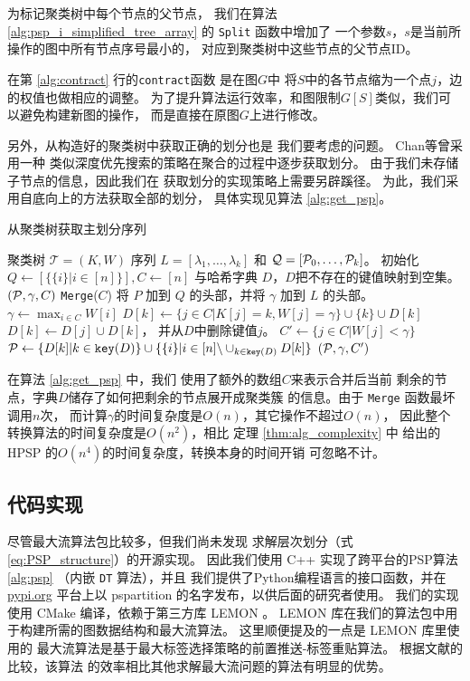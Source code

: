 为标记聚类树中每个节点的父节点，
我们在算法 \ref{alg:psp_i_simplified_tree_array} 的 \texttt{Split} 函数中增加了
一个参数$s$，$s$是当前所操作的图中所有节点序号最小的，
对应到聚类树中这些节点的父节点ID。

在第 \ref{alg:contract} 行的\texttt{contract}函数 是在图$G$中
将$S$中的各节点缩为一个点$j$，边的权值也做相应的调整。
为了提升算法运行效率，和图限制$G[S]$类似，我们可以避免构建新图的操作，
而是直接在原图$G$上进行修改。

另外，从构造好的聚类树中获取正确的划分也是
我们要考虑的问题。
Chan等\cite{chan2020agglomerative}曾采用一种
类似深度优先搜索的策略在聚合的过程中逐步获取划分。
由于我们未存储子节点的信息，因此我们在
获取划分的实现策略上需要另辟蹊径。
为此，我们采用自底向上的方法获取全部的划分，
具体实现见算法 \ref{alg:get_psp}。

\begin{algorithm}[!ht]
	\caption{从聚类树获取主划分序列}\label{alg:get_psp}
	\begin{algorithmic}[1]
		\REQUIRE 聚类树 $\mathcal{T}=(K, W)$
		\ENSURE 序列 $L=[\lambda_1, \dots, \lambda_k]$
    和 $\mathcal{Q}=[\P_0, \dots, \P_k]$。
    \STATE 初始化 $Q\leftarrow [ \{\{i\}|i\in [n]\} ], C\leftarrow [n]$
    与哈希字典 $D$，$D$把不存在的键值映射到空集。
		\STATE $(\P,\gamma, C)$ \leftarrow \texttt{Merge}($C$)
    \STATE 将 $P$ 加到 $Q$ 的头部，并将 $\gamma$ 加到 $L$ 的头部。
    \ENDWHILE
    \STATE $\gamma \gets \max_{i\in C} W[i]$
    \STATE $D[k] \gets \{ j\in C | K[j] = k, W[j]=\gamma\} \cup \{k\} \cup D[k]$
    \STATE $D[k] \leftarrow D[j] \cup D[k]$，
    并从$D$中删除键值$j$。
    \ENDFOR
    \STATE $C' \leftarrow  \{j\in C | W[j]<\gamma\}$
    \STATE $\P \gets \{D[k] | k \in \texttt{key}(D)\} \cup \{\{i\} | i \in [n]\backslash \cup_{k \in \texttt{key}(D)} D[k] \}$
    \RETURN $(\P, \gamma, C')$
		\ENDFUNCTION
	\end{algorithmic}
\end{algorithm}

在算法 \ref{alg:get_psp} 中，我们
使用了额外的数组$C$来表示合并后当前
剩余的节点，字典$D$储存了如何把剩余的节点展开成聚类簇
的信息。由于 \texttt{Merge} 函数最坏调用$n$次，
而计算$\gamma$的时间复杂度是$O(n)$，其它操作不超过$O(n)$，
因此整个转换算法的时间复杂度是$O(n^2)$，相比
定理 \ref{thm:alg_complexity} 中
给出的HPSP 的$O(n^4)$的时间复杂度，转换本身的时间开销
可忽略不计。

\subsection{代码实现}
尽管最大流算法包比较多，但我们尚未发现
求解层次划分（式\eqref{eq:PSP_structure}）的开源实现。
因此我们使用 C++ 实现了跨平台的PSP算法 \ref{alg:psp} 
（内嵌 \texttt{DT} 算法），并且
我们提供了Python编程语言的接口函数，并在 \url{pypi.org}
平台上以 pspartition
的名字发布，以供后面的研究者使用。
我们的实现使用 CMake 编译，依赖于第三方库 LEMON \cite{dezsHo2011lemon}。 
LEMON 库在我们的算法包中用于构建所需的图数据结构和最大流算法。
这里顺便提及的一点是 LEMON 库里使用的
最大流算法是基于最大标签选择策略的前置推送-标签重贴算法。
根据文献的比较，该算法
的效率相比其他求解最大流问题的算法有明显的优势。

